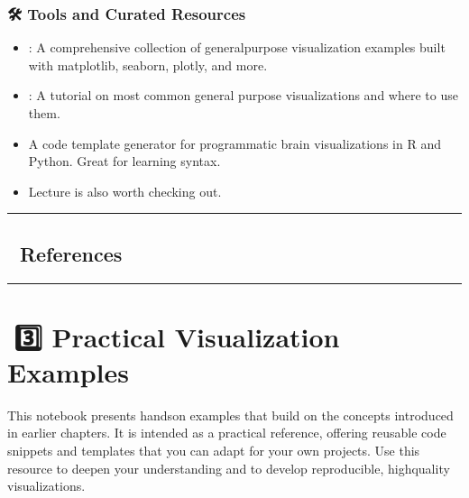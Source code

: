 \documentclass[letterpaper,10pt,english]{jupyterBook}
\begin{document}
\subsubsection{🛠️ Tools and Curated Resources}
\label{\detokenize{chapters/03/03b_visualization-tools:tools-and-curated-resources}}\begin{itemize}
\item {} 
\sphinxAtStartPar
{}: A comprehensive collection of general\sphinxhyphen{}purpose visualization examples built with matplotlib, seaborn, plotly, and more.

\item {} 
\sphinxAtStartPar
{}: A tutorial on most common general purpose visualizations and where to use them.

\item {} 
\sphinxAtStartPar
{} A code template generator for programmatic brain visualizations in R and Python. Great for learning syntax.

\item {} 
\sphinxAtStartPar
{} Lecture is also worth checking out.

\end{itemize}


\bigskip\hrule\bigskip



\subsection{📑 References}
\label{\detokenize{chapters/03/03b_visualization-tools:references}}

\bigskip\hrule\bigskip


\sphinxstepscope


\section{📙3️⃣ Practical Visualization Examples}
\label{\detokenize{chapters/03/03c_visualization-examples:practical-visualization-examples}}\label{\detokenize{chapters/03/03c_visualization-examples::doc}}
\sphinxAtStartPar
This notebook presents hands\sphinxhyphen{}on examples that build on the concepts introduced in earlier chapters. It is intended as a practical reference, offering reusable code snippets and templates that you can adapt for your own projects. Use this resource to deepen your understanding and to develop reproducible, high\sphinxhyphen{}quality visualizations.
\end{document}
